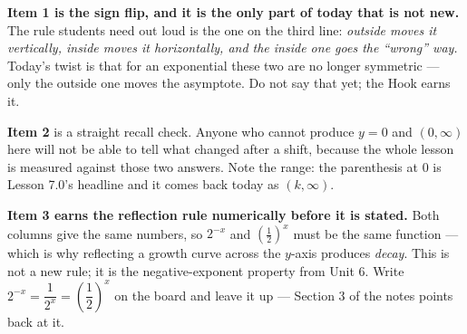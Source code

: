 \documentclass[10pt]{article}
\begin{document}
\begin{teachernote}
\textbf{Item 1 is the sign flip, and it is the only part of today that is not new.} The rule students
need out loud is the one on the third line: \emph{outside moves it vertically, inside moves it
horizontally, and the inside one goes the ``wrong'' way.} Today's twist is that for an exponential
these two are no longer symmetric --- only the outside one moves the asymptote. Do not say that yet;
the Hook earns it.

\textbf{Item 2} is a straight recall check. Anyone who cannot produce $y=0$ and $(0,\infty)$ here
will not be able to tell what changed after a shift, because the whole lesson is measured against
those two answers. Note the range: the parenthesis at $0$ is Lesson 7.0's headline and it comes back
today as $(k,\infty)$.

\textbf{Item 3 earns the reflection rule numerically before it is stated.} Both columns give the same
numbers, so $2^{-x}$ and $\left(\frac12\right)^{x}$ must be the same function --- which is why
reflecting a growth curve across the $y$-axis produces \emph{decay}. This is not a new rule; it is
the negative-exponent property from Unit 6. Write $2^{-x}=\dfrac{1}{2^{x}}=\left(\dfrac12\right)^{x}$
on the board and leave it up --- Section 3 of the notes points back at it.
\end{teachernote}
\end{document}
